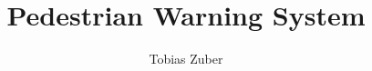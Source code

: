 \documentclass[master,english]{hgbthesis}
\title{Pedestrian Warning System}
\author{Tobias Zuber}
\begin{document}

\frontmatter		%

\maketitle
\tableofcontents




\mainmatter         %






% 




\appendix           %


\MakeBibliography    %



\end{document}

